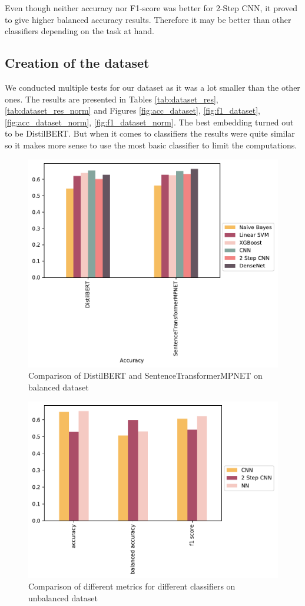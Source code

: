 Even though neither accuracy nor F1-score was better for 2-Step CNN, it proved to give higher balanced accuracy results. Therefore it may be better than other classifiers depending on the task at hand.

\subsection{Creation of the dataset}
We conducted multiple tests for our dataset as it was a lot smaller than the other ones. The results are presented in Tables \ref{tab:dataset_res}, \ref{tab:dataset_res_norm} and Figures \ref{fig:acc_dataset}, \ref{fig:f1_dataset}, \ref{fig:acc_dataset_norm}, \ref{fig:f1_dataset_norm}. The best embedding turned out to be DistilBERT. But when it comes to classifiers the results were quite similar so it makes more sense to use the most basic classifier to limit the computations.

\onecolumn



\begin{figure}
\centering
\includegraphics[width=0.8\linewidth]{plots/accuracy_small_balanced.pdf}
\caption{Comparison of DistilBERT and SentenceTransformerMPNET on balanced dataset}
\label{fig:embed_comparison}
\end{figure}


\begin{figure}
\centering
\includegraphics[width=0.8\linewidth]{plots/metrics_comparison_small.pdf}
\caption{Comparison of different metrics for different classifiers on unbalanced dataset}
\label{fig:metric_comparison}
\end{figure}

